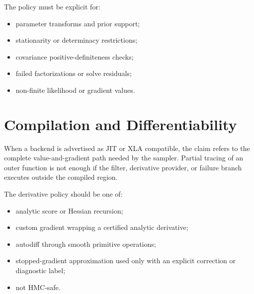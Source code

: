 The policy must be explicit for:
\begin{itemize}
  \item parameter transforms and prior support;
  \item stationarity or determinacy restrictions;
  \item covariance positive-definiteness checks;
  \item failed factorizations or solve residuals;
  \item non-finite likelihood or gradient values.
\end{itemize}

\section{Compilation and Differentiability}
\label{sec:bf-hmc-target-compilation}

When a backend is advertised as JIT or XLA compatible, the claim refers to the
complete value-and-gradient path needed by the sampler.  Partial tracing of an
outer function is not enough if the filter, derivative provider, or failure
branch executes outside the compiled region.

The derivative policy should be one of:
\begin{itemize}
  \item analytic score or Hessian recursion;
  \item custom gradient wrapping a certified analytic derivative;
  \item autodiff through smooth primitive operations;
  \item stopped-gradient approximation used only with an explicit correction or
    diagnostic label;
  \item not HMC-safe.
\end{itemize}
